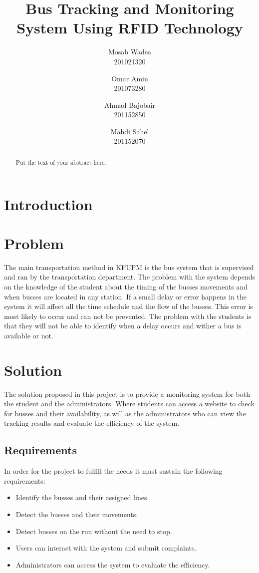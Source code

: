 \documentclass[a4paper,twoside]{article}
\title{Bus Tracking and Monitoring System Using RFID Technology}
\author{
        Mosab Wadea\\
        201021320
\and
        Omar Amin\\
        201073280
\and
        Ahmad Bajobair\\
        201152850
\and
        Mahdi Sahel\\
        201152070
}
\begin{document}
\maketitle


\begin{abstract}
Put the text of your abstract here.
\end{abstract}


\section{Introduction}



\section{Problem}
The main transportation method in KFUPM is the bus system that is supervised and ran by the transportation department. The problem with the system depends on the knowledge of the student about the timing of the busses movements and when busses are located in any station. If a small delay or error happens in the system it will affect all the time schedule and the flow of the busses. This error is most likely to occur and can not be prevented. The problem with the students is that they will not be able to identify when a delay occurs and wither a bus is available or not.
%

\section{Solution}
The solution proposed in this project is to provide a monitoring system for both the student and the administrators. Where students can access a website to check for busses and their availability, as will as the administrators who can view the tracking results and evaluate the efficiency of the system.

\subsection{Requirements}
In order for the project to fulfill the needs it must sustain the following requirements:
\begin{itemize}
\item
Identify the busses and their assigned lines.
\item
Detect the busses and their movements.
\item
Detect busses on the run without the need to stop.
\item
Users can interact with the system and submit complaints.
\item
Administrators can access the system to evaluate the efficiency.
\end{itemize}
\end{document}
